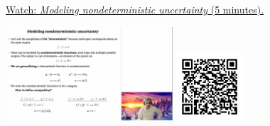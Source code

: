 
\begin{minipage}{10cm}
    \href{https://act4e-spring21.netlify.app/videos/spring2021-monads-a:modeling-nondet-unc.html}{Watch: \emph{Modeling nondeterministic uncertainty} (5 minutes).}
        
    \href{https://act4e-spring21.netlify.app/videos/spring2021-monads-a:modeling-nondet-unc.html}{\includegraphics[height=3.5cm]{spring2021-monads-a:modeling-nondet-unc/thumbnails.jpg}}
    \href{https://act4e-spring21.netlify.app/videos/spring2021-monads-a:modeling-nondet-unc.html}{\includegraphics[height=2.5cm]{spring2021-monads-a:modeling-nondet-unc/qrcode.png}}
\end{minipage}
